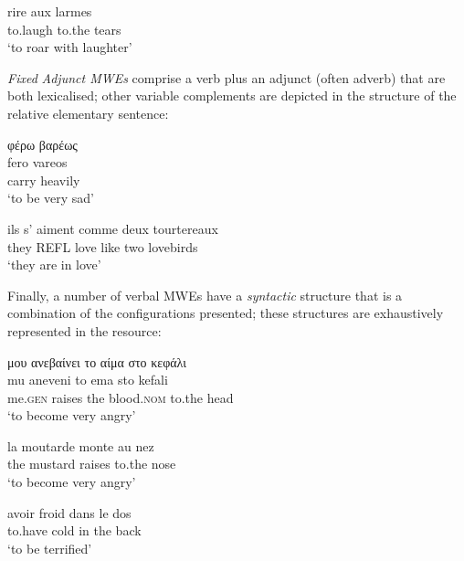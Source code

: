 \documentclass[output=paper]{langsci/langscibook}
\begin{document}
\begin{exe}
\ex \label{ex:3:19}
\gll  rire aux larmes \\
to.laugh to.the tears\\
\glt ‘to roar with laughter’
\end{exe}

\textit{Fixed}\textit{ Adjunct MWEs} comprise a verb plus an
adjunct (often adverb) that are both lexicalised; other variable
complements are depicted in the structure of the relative elementary
sentence:

\begin{exe}
\ex \label{ex:3:20}
\glll   φέρω βαρέως \\
fero vareos\\
carry heavily\\
\glt %
‘to be very sad’
\end{exe}

\begin{exe}
\ex \label{ex:3:21}
\gll ils s’ aiment comme deux tourtereaux \\
they REFL love like two lovebirds\\
\glt ‘they are in love’
\end{exe}

Finally, a number of verbal MWEs have a \textit{syntactic}
structure that is a combination of the configurations presented;
these structures are exhaustively represented in the resource:

\begin{exe}
\ex \label{ex:3:22}
\glll  μου ανεβαίνει το αίμα στο κεφάλι \\
mu aneveni to ema sto kefali\\
me.\textsc{gen} raises the blood.\textsc{nom} to.the head\\
\glt %
‘to become very angry’
\end{exe}

\begin{exe}
\ex \label{ex:3:23}
\gll  la moutarde monte au nez \\
the mustard raises to.the nose\\
\glt ‘to become very angry’
\end{exe}

\begin{exe}
\ex \label{ex:3:24}
\gll  avoir froid dans le dos\\
to.have cold in the back\\
\glt ‘to be terrified’
\end{exe}
\end{document}
